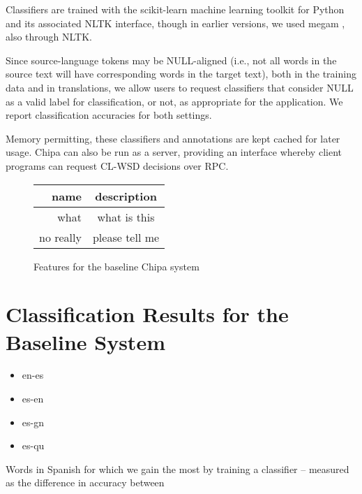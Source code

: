 
Classifiers are trained with the scikit-learn machine learning toolkit
\cite{scikit-learn} for Python and its associated NLTK interface, though in
earlier versions, we used megam \cite{daume04cg-bfgs}, also through NLTK.

Since source-language tokens may be NULL-aligned (i.e., not all words in the
source text will have corresponding words in the target text), both in the
training data and in translations, we allow users to request classifiers that
consider NULL as a valid label for classification, or not, as appropriate for
the application. We report classification accuracies for both settings.

Memory permitting, these classifiers and annotations are kept cached for later
usage. Chipa can also be run as a server, providing an interface whereby client
programs can request CL-WSD decisions over RPC.

\begin{figure*}
  \begin{centering}
  \begin{tabular}{|r|c|}
    \hline
    name      & description  \\
    \hline
    what      & what is this \\
    no really & please tell me \\
    \hline
  \end{tabular}
  \end{centering}
  \caption{Features for the baseline Chipa system}
  \label{fig:baselinefeatures}
\end{figure*}

\section{Classification Results for the Baseline System}

\begin{itemize}
\item en-es
\item es-en
\item es-gn
\item es-qu
\end{itemize}

Words in Spanish for which we gain the most by training a classifier --
measured as the difference in accuracy between

